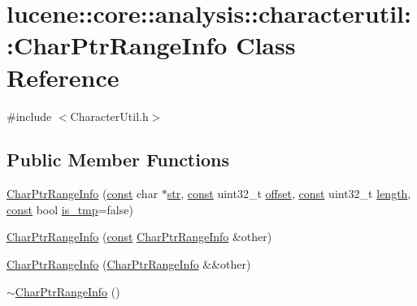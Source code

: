 \hypertarget{classlucene_1_1core_1_1analysis_1_1characterutil_1_1CharPtrRangeInfo}{}\section{lucene\+:\+:core\+:\+:analysis\+:\+:characterutil\+:\+:Char\+Ptr\+Range\+Info Class Reference}
\label{classlucene_1_1core_1_1analysis_1_1characterutil_1_1CharPtrRangeInfo}


{\ttfamily \#include $<$Character\+Util.\+h$>$}

\subsection*{Public Member Functions}
\begin{DoxyCompactItemize}
\item 
\mbox{\hyperlink{classlucene_1_1core_1_1analysis_1_1characterutil_1_1CharPtrRangeInfo_a226d1ddc2c1996f0cd4fc6f2127f8196}{Char\+Ptr\+Range\+Info}} (\mbox{\hyperlink{ZlibCrc32_8h_a2c212835823e3c54a8ab6d95c652660e}{const}} char $\ast$\mbox{\hyperlink{classlucene_1_1core_1_1analysis_1_1characterutil_1_1CharPtrRangeInfo_a353ede88ef69e0a7c11523fd7d419ef6}{str}}, \mbox{\hyperlink{ZlibCrc32_8h_a2c212835823e3c54a8ab6d95c652660e}{const}} uint32\+\_\+t \mbox{\hyperlink{classlucene_1_1core_1_1analysis_1_1characterutil_1_1CharPtrRangeInfo_a9ac49265cf8865e7a935631243c7e9bd}{offset}}, \mbox{\hyperlink{ZlibCrc32_8h_a2c212835823e3c54a8ab6d95c652660e}{const}} uint32\+\_\+t \mbox{\hyperlink{classlucene_1_1core_1_1analysis_1_1characterutil_1_1CharPtrRangeInfo_a816e4469bb018338dacaf8444c279688}{length}}, \mbox{\hyperlink{ZlibCrc32_8h_a2c212835823e3c54a8ab6d95c652660e}{const}} bool \mbox{\hyperlink{classlucene_1_1core_1_1analysis_1_1characterutil_1_1CharPtrRangeInfo_ab54d53df8367d85ed226d19c187d6e28}{is\+\_\+tmp}}=false)
\item 
\mbox{\hyperlink{classlucene_1_1core_1_1analysis_1_1characterutil_1_1CharPtrRangeInfo_a7a6bcc19c443e90c94bdc7314aaa528a}{Char\+Ptr\+Range\+Info}} (\mbox{\hyperlink{ZlibCrc32_8h_a2c212835823e3c54a8ab6d95c652660e}{const}} \mbox{\hyperlink{classlucene_1_1core_1_1analysis_1_1characterutil_1_1CharPtrRangeInfo}{Char\+Ptr\+Range\+Info}} \&other)
\item 
\mbox{\hyperlink{classlucene_1_1core_1_1analysis_1_1characterutil_1_1CharPtrRangeInfo_aa0f50f7970050ddffb8fe3c043ec1c04}{Char\+Ptr\+Range\+Info}} (\mbox{\hyperlink{classlucene_1_1core_1_1analysis_1_1characterutil_1_1CharPtrRangeInfo}{Char\+Ptr\+Range\+Info}} \&\&other)
\item 
\mbox{\hyperlink{classlucene_1_1core_1_1analysis_1_1characterutil_1_1CharPtrRangeInfo_a44c560301551a00fb0a51d9a9edce477}{$\sim$\+Char\+Ptr\+Range\+Info}} ()
\end{DoxyCompactItemize}
